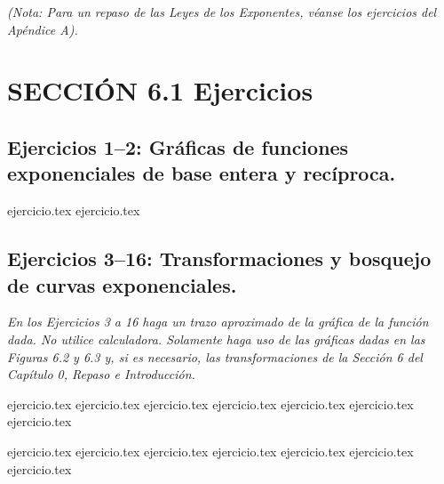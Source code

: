 
\noindent \textit{(Nota: Para un repaso de las Leyes de los Exponentes, véanse los ejercicios del Apéndice A).}

\section*{SECCIÓN 6.1 \quad Ejercicios}

\subsection*{Ejercicios 1--2: Gráficas de funciones exponenciales de base entera y recíproca.}

\begin{enumerate}
    {ejercicio.tex}
    {ejercicio.tex}
\end{enumerate}

\subsection*{Ejercicios 3--16: Transformaciones y bosquejo de curvas exponenciales.}

\noindent \textit{En los Ejercicios 3 a 16 haga un trazo aproximado de la gráfica de la función dada. No utilice calculadora. Solamente haga uso de las gráficas dadas en las Figuras 6.2 y 6.3 y, si es necesario, las transformaciones de la Sección 6 del Capítulo 0, Repaso e Introducción.}

\begin{enumerate}
    \setcounter{enumi}{2}
    \begin{minipage}{0.45\textwidth}
    {ejercicio.tex}
    {ejercicio.tex}
    {ejercicio.tex}
    {ejercicio.tex}
    {ejercicio.tex}
    {ejercicio.tex}
    {ejercicio.tex}
    \end{minipage}%
    \begin{minipage}{0.45\textwidth}
    {ejercicio.tex}
    {ejercicio.tex}
    {ejercicio.tex}
    {ejercicio.tex}
    {ejercicio.tex}
    {ejercicio.tex}
    {ejercicio.tex}
    \end{minipage}
\end{enumerate}

